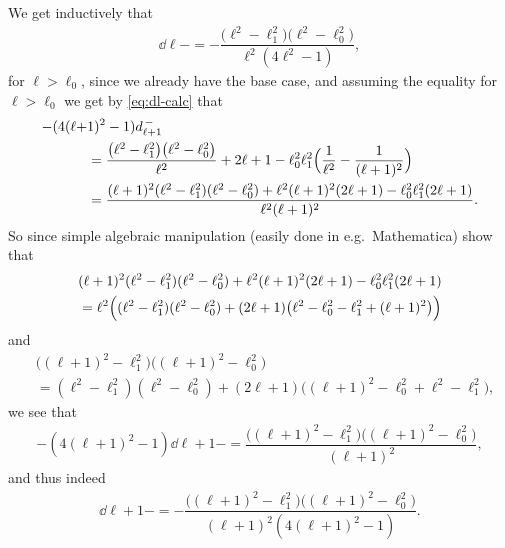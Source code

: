 We get inductively that
\begin{align*}
  \dd{\ell}{-} = -\dfrac{\bigl(\ell^2 - \ell_1^2\bigr)\bigl( \ell^2 - \ell_0^2 \bigr)}{\ell^2(4\ell^2-1)},
\end{align*}
for $\ell>\ell_0$, since we already have the base case, and assuming the equality for $\ell>\ell_0$ we get by \cref{eq:dl-calc} that
\begin{align*}
  -(4(\ell+&1)^2-1)d_{\ell+1}^{\,-} \\
  &= \dfrac{\bigl(\ell^2 - \ell_1^2\bigr)\bigl( \ell^2 - \ell_0^2 \bigr)}{\ell^2} + 2\ell+1 - \ell_0^2\ell_1^2\Bigl( \dfrac{1}{\ell^2} - \dfrac{1}{(\ell+1)^2} \Bigr) \\
  &= \dfrac{(\ell+1)^2(\ell^2-\ell_1^2)(\ell^2-\ell_0^2) + \ell^2(\ell+1)^2(2\ell+1) - \ell_0^2\ell_1^2(2\ell+1)}{\ell^2(\ell+1)^2}.
\end{align*}
So since simple algebraic manipulation (easily done in e.g.\ Mathematica) show that
\begin{align*}
  &(\ell+1)^2(\ell^2-\ell_1^2)(\ell^2-\ell_0^2) + \ell^2(\ell+1)^2(2\ell+1) - \ell_0^2\ell_1^2(2\ell+1)\\
  &= \ell^2\Bigl((\ell^2-\ell_1^2)(\ell^2-\ell_0^2)+ (2\ell+1)\bigl( \ell^2 - \ell_0^2 - \ell_1^2+(\ell+1)^2 \bigr) \Bigr) \\  
\end{align*}
and
\begin{align*}
  &\bigl((\ell+1)^2-\ell_1^2\bigr)\bigl( (\ell+1)^2 - \ell_0^2\bigr) \\
  &= (\ell^2-\ell_1^2)(\ell^2-\ell_0^2) + (2\ell+1)\bigl( (\ell+1)^2 -\ell_0^2 + \ell^2-\ell_1^2  \bigr),
\end{align*}
we see that
\begin{align*}
  -(4(\ell+1)^2-1)\dd{\ell+1}{-} = \dfrac{\bigl((\ell+1)^2-\ell_1^2\bigr)\bigl((\ell+1)^2-\ell_0^2\bigr)}{(\ell+1)^2},
\end{align*}
and thus indeed
\begin{align*}
  \dd{\ell+1}{-} = - \dfrac{\bigl((\ell+1)^2-\ell_1^2\bigr)\bigl((\ell+1)^2-\ell_0^2\bigr)}{(\ell+1)^2(4(\ell+1)^2-1)}.
\end{align*}




